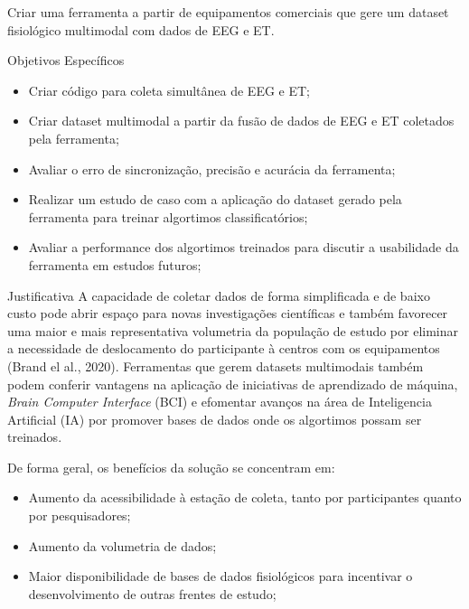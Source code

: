 \documentclass[a4paper, 12pt]{ppgeb}
\makeatletter
\renewcommand{\section}{\@startsection
{section}
{1}
{0mm}
{-\baselineskip}
{0.5\baselineskip}
{\large\bfseries\scshape}}
\renewcommand{\subsection}{\@startsection
{subsection}
{2}
{0mm}
{-\baselineskip}
{0.5\baselineskip}
{\bf\sffamily}}
\makeatother
\begin{document}
Criar uma ferramenta a partir de equipamentos comerciais que gere um dataset fisiológico multimodal com dados de EEG e ET.

\subsection{Objetivos Específicos}

\begin{itemize}
    \item Criar código para coleta simultânea de EEG e ET;
    \item Criar dataset multimodal a partir da fusão de dados de EEG e ET coletados pela ferramenta;
    \item Avaliar o erro de sincronização, precisão e acurácia da ferramenta;
    \item Realizar um estudo de caso com a aplicação do dataset gerado pela ferramenta para treinar algortimos classificatórios;
    \item Avaliar a performance dos algortimos treinados para discutir a usabilidade da ferramenta em estudos futuros;
\end{itemize}

\section{Justificativa}
A capacidade de coletar dados de forma simplificada e de baixo custo pode abrir espaço para novas investigações 
científicas e também favorecer uma maior e mais representativa volumetria da população de estudo por eliminar a necessidade
de deslocamento do participante à centros com os equipamentos (Brand el al., 2020). Ferramentas que gerem
datasets multimodais também podem conferir vantagens na aplicação de iniciativas de aprendizado de máquina, \textit{Brain Computer Interface} (BCI) 
e efomentar avanços na área de Inteligencia Artificial (IA) por promover bases de dados onde os algortimos possam ser treinados. 

De forma geral, os benefícios da solução se concentram em:
\begin{itemize}
    \item Aumento da acessibilidade à estação de coleta, tanto por participantes quanto por pesquisadores;
    \item Aumento da volumetria de dados;
    \item Maior disponibilidade de bases de dados fisiológicos para incentivar o desenvolvimento de outras frentes de estudo;
\end{itemize}
\end{document}
